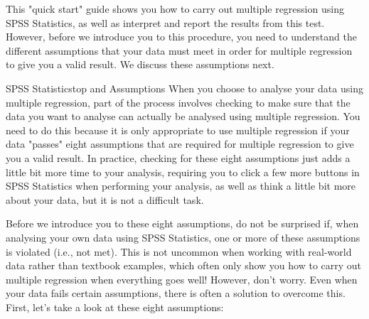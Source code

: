 \documentclass[]{article}
\begin{document}
	This "quick start" guide shows you how to carry out multiple regression using SPSS Statistics, as well as interpret and report the results from this test. However, before we introduce you to this procedure, you need to understand the different assumptions that your data must meet in order for multiple regression to give you a valid result. We discuss these assumptions next.
	
	SPSS Statisticstop and
	Assumptions
	When you choose to analyse your data using multiple regression, part of the process involves checking to make sure that the data you want to analyse can actually be analysed using multiple regression. You need to do this because it is only appropriate to use multiple regression if your data "passes" eight assumptions that are required for multiple regression to give you a valid result. In practice, checking for these eight assumptions just adds a little bit more time to your analysis, requiring you to click a few more buttons in SPSS Statistics when performing your analysis, as well as think a little bit more about your data, but it is not a difficult task.
	
	Before we introduce you to these eight assumptions, do not be surprised if, when analysing your own data using SPSS Statistics, one or more of these assumptions is violated (i.e., not met). This is not uncommon when working with real-world data rather than textbook examples, which often only show you how to carry out multiple regression when everything goes well! However, don’t worry. Even when your data fails certain assumptions, there is often a solution to overcome this. First, let's take a look at these eight assumptions:
	
\end{document}
